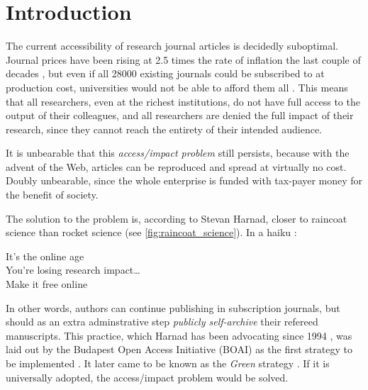 \documentclass[11pt, openany, oneside, article, a4paper, twocolumn]{memoir}
\begin{document}
\section{Introduction}

The current accessibility of research journal articles is decidedly
suboptimal. Journal prices have been rising at 2.5 times the rate of
inflation the last couple of decades \cite{monograph_serial_costs,
suber2008open}, but even if all 28000 existing journals could be
subscribed to at production cost, universities would not be able to afford
them all \cite{harnad2008access}. This means that all researchers, even at
the richest institutions, do not have full access to the output of their
colleagues, and all researchers are denied the full impact of their
research, since they cannot reach the entirety of their intended audience.

It is unbearable that this \emph{access/impact problem} still persists,
because with the advent of the Web, articles can be reproduced and spread
at virtually no cost. Doubly unbearable, since the whole enterprise is
funded with tax-payer money for the benefit of society. 

The solution to the problem is, according to Stevan Harnad, closer to
raincoat science than rocket science (see \autoref{fig:raincoat_science}). In a haiku \cite{harnad_raincoat}:
\begin{displayquote}
\begin{small}
It's the online age\\
You're losing research impact\dots \\
Make it free online
\end{small}
\end{displayquote}
In other words, authors can continue publishing in subscription journals,
but should as an extra adminstrative step \emph{publicly self-archive}
their refereed manuscripts. This practice, which Harnad has been
advocating since 1994 \cite{harnad1995subversive}, was laid out by the
Budapest Open Access Initiative (BOAI) as the first strategy to be
implemented \cite{boai}. It later came to be known as the \emph{Green}
strategy \cite{harnad2004access}. If it is universally adopted, the
access/impact problem would be solved.
\end{document}
